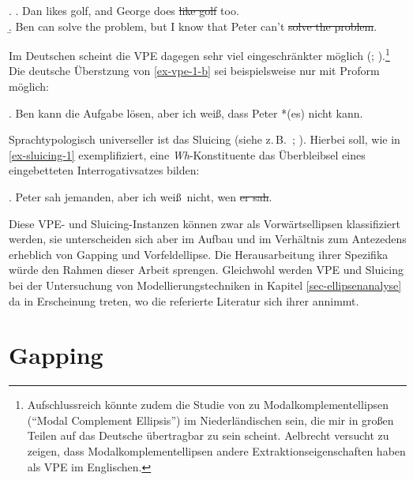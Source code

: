 \ex. \label{ex-vpe-1}
\a. Dan likes golf, and George does \sout{like golf} too. \\ \citep[(1)]{Dalrymple:etal:91}\label{ex-vpe-1-a}
\b. Ben can solve the problem, but I know that Peter can't \sout{solve the problem}. \hfill \citep[(32a), 134]{Winkler:05}\label{ex-vpe-1-b}

Im Deutschen scheint die VPE dagegen sehr viel eingeschränkter möglich (\citealt[158ff]{Lobeck:95}; \citealt[Chapter~3]{Winkler:05}).\footnote{Aufschlussreich könnte zudem die Studie von \citet[Chapter~2]{Aelbrecht:10} zu Modalkomplementellipsen ("`Modal Complement Ellipsis"') im Niederländischen sein, die mir in gro\ss en Teilen auf das Deutsche übertragbar zu sein scheint. Aelbrecht versucht zu zeigen, dass Modalkomplementellipsen andere Extraktionseigenschaften haben als VPE im Englischen.} Die deutsche Überstzung von \ref{ex-vpe-1-b} sei beispielsweise nur mit Proform möglich: 

\ex. Ben kann die Aufgabe lösen, aber ich weiß, dass Peter *(es) nicht kann. \hfill \citep[(33a), 134]{Winkler:05}\label{ex-vpe-2}

Sprachtypologisch universeller ist das Sluicing (siehe z.\,B.\  \citealt{Ross:69}; \citealt{Merchant:01}). Hierbei soll, wie in \ref{ex-sluicing-1} exemplifiziert, eine \textit{Wh}-Konstituente das Überbleibsel eines eingebetteten Interrogativsatzes bilden: 
 
\ex. \label{ex-sluicing-1}Peter sah jemanden, aber ich wei\ss\ nicht, wen \sout{er sah}.

Diese VPE- und Sluicing-Instanzen können zwar als Vorwärtsellipsen klassifiziert werden, sie unterscheiden sich aber im Aufbau und im Verhältnis zum Antezedens erheblich von Gapping und Vorfeldellipse. Die Herausarbeitung ihrer Spezifika würde den Rahmen dieser Arbeit sprengen. Gleichwohl werden VPE und Sluicing bei der Untersuchung von Modellierungstechniken in Kapitel \ref{sec-ellipsenanalyse} da in Erscheinung treten, wo die referierte Literatur sich ihrer annimmt.


\section{Gapping}\label{sec-gapping}

